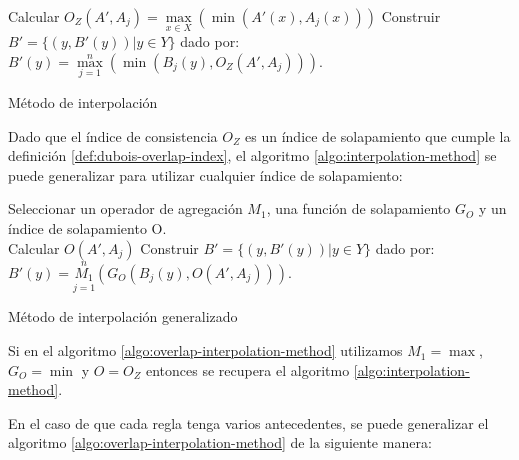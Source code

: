 \begin{algorithm}
\DontPrintSemicolon
{}
\vspace{0.4 cm}
 {
Calcular $O_{Z}(A',A_{j}) = \max\limits_{x \in X}(\min(A'(x),A_{j}(x))) $
}
Construir $B' = \{(y, B'(y))|y \in Y\}$ dado por: \\
\centering
\nonl $B'(y) = \max\limits_{j=1}^{n}(\min(B_{j}(y),O_{Z}(A', A_{j})))$.\\
\;
\caption{Método de interpolación}
\label{algo:interpolation-method}
\end{algorithm}
Dado que el índice de consistencia $O_{Z}$ es un índice de solapamiento que cumple la definición \ref{def:dubois-overlap-index}, el algoritmo \ref{algo:interpolation-method} se puede generalizar para utilizar cualquier índice de solapamiento:

\begin{algorithm}
\DontPrintSemicolon
{}
\vspace{0.4 cm}
Seleccionar un operador de agregación $M_{1}$, una función de solapamiento $G_{O}$ y un índice de solapamiento O.\\
 {
Calcular $O(A', A_{j})$
}
Construir $B' = \{(y, B'(y))|y \in Y\}$ dado por: \\
\centering
\nonl $B'(y) = \overset{n}{\underset{j=1}{M_{1}}}(G_{O}(B_{j}(y),O(A', A_{j})))$.\\
\;
\caption{Método de interpolación generalizado}
\label{algo:overlap-interpolation-method}
\end{algorithm}

Si en el algoritmo \ref{algo:overlap-interpolation-method} utilizamos $M_{1} = \max$, $G_{O} = \min$ y $O = O_{Z}$ entonces se recupera el algoritmo \ref{algo:interpolation-method}.

En el caso de que cada regla tenga varios antecedentes, se puede generalizar el algoritmo \ref{algo:overlap-interpolation-method} de la siguiente manera:

